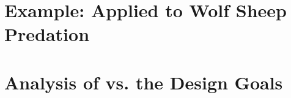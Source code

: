 


\section{Example: \fw Applied to Wolf Sheep Predation}







\section{Analysis of \fw  vs. the Design Goals}


